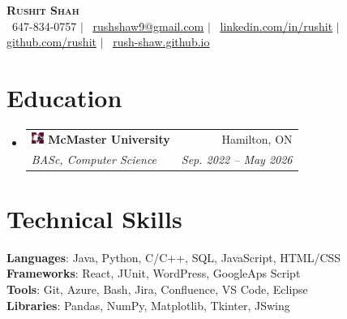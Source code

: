 \documentclass[letterpaper,11pt]{article}
\makeatletter
\newcommand{\resumeSubheading}[4]{
  \vspace{-2pt}\item
    \begin{tabular*}{0.97\textwidth}[t]{l@{\extracolsep{\fill}}r}
      \textbf{#1} & #2 \\
      \textit{\small#3} & \textit{\small #4} \\
    \end{tabular*}\vspace{-7pt}
}
\newcommand{\resumeSubHeadingListStart}{\begin{itemize}[leftmargin=0.15in, label={}]}
\newcommand{\resumeSubHeadingListEnd}{\end{itemize}}
\makeatother
\begin{document}

\begin{center}
    \textbf{\Huge \scshape Rushit Shah} \\ \vspace{8.5pt}
    \small 
    \faPhone \, 647-834-0757 $|$ 
    \faEnvelope \, \href{mailto:rushshaw9@gmail.com}{\underline{rushshaw9@gmail.com}} $|$ 
    \faLinkedin \, \href{https://www.linkedin.com/in/rushit-shah-03b37319a/}{\underline{linkedin.com/in/rushit}} $|$ 
    \faGithub \, \href{https://github.com/Rush-Shaw}{\underline{github.com/rushit}} $|$ 
    \faPaperclip \, \href{https://rush-shaw.github.io/}{\underline{rush-shaw.github.io}}
\end{center}


\section{Education}
  \resumeSubHeadingListStart
    \resumeSubheading
      {\includegraphics[width=0.4cm]{mcmaster_icon.png} McMaster University}{Hamilton, ON}
      {BASc, Computer Science}{Sep. 2022 -- May 2026}
  \resumeSubHeadingListEnd

\section{Technical Skills}
 \begin{itemize}[leftmargin=0.15in, label={}]
    \small{\item{
     \textbf{Languages}{: Java, Python, C/C++, SQL, JavaScript, HTML/CSS} \\
     \textbf{Frameworks}{: React, JUnit, WordPress, GoogleAps Script} \\
     \textbf{Tools}{: Git, Azure, Bash, Jira, Confluence, VS Code, Eclipse} \\
     \textbf{Libraries}{: Pandas, NumPy, Matplotlib, Tkinter, JSwing}
    }}
 \end{itemize}
\end{document}
